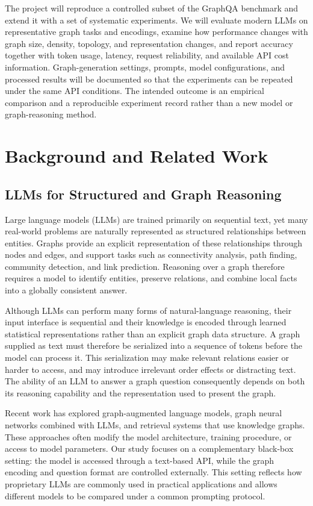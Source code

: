\documentclass[11pt,a4paper]{article}
\begin{document}
The project will  reproduce a controlled subset of the GraphQA benchmark and extend it with a set of systematic experiments. We will evaluate modern LLMs on representative graph tasks and encodings, examine how performance changes with graph size, density, topology, and representation changes, and report accuracy together with token usage, latency, request reliability, and available API cost information. Graph-generation settings, prompts, model configurations, and processed results will be documented so that the experiments can be repeated under the same API conditions. The intended outcome is an empirical comparison and a reproducible experiment record rather than a new model or graph-reasoning method.

\section{Background and Related Work}

\subsection{LLMs for Structured and Graph Reasoning}

Large language models (LLMs) are trained primarily on sequential text, yet many real-world problems are naturally represented as structured relationships between entities. Graphs provide an explicit representation of these relationships through nodes and edges, and support tasks such as connectivity analysis, path finding, community detection, and link prediction. Reasoning over a graph therefore requires a model to identify entities, preserve relations, and combine local facts into a globally consistent answer.

Although LLMs can perform many forms of natural-language reasoning, their input interface is sequential and their knowledge is encoded through learned statistical representations rather than an explicit graph data structure. A graph supplied as text must therefore be serialized into a sequence of tokens before the model can process it. This serialization may make relevant relations easier or harder to access, and may introduce irrelevant order effects or distracting text. The ability of an LLM to answer a graph question consequently depends on both its reasoning capability and the representation used to present the graph.

Recent work has explored graph-augmented language models, graph neural networks combined with LLMs, and retrieval systems that use knowledge graphs. These approaches often modify the model architecture, training procedure, or access to model parameters. Our study focuses on a complementary black-box setting: the model is accessed through a text-based API, while the graph encoding and question format are controlled externally. This setting reflects how proprietary LLMs are commonly used in practical applications and allows different models to be compared under a common prompting protocol.
\end{document}
